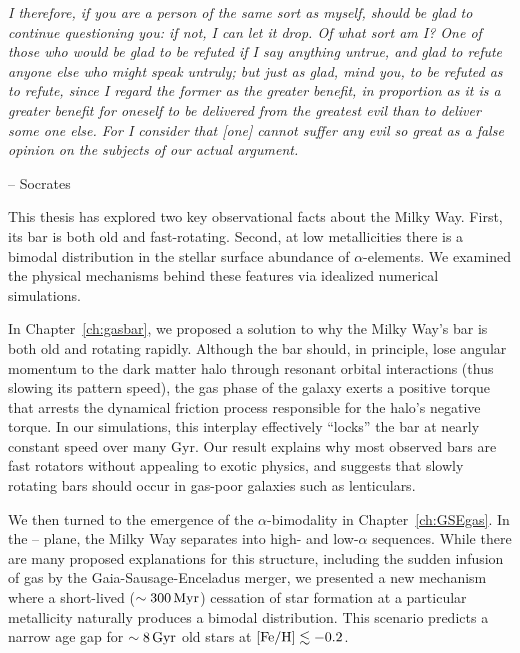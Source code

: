 
\begin{adjustwidth}{.8cm}{0cm}
\textit{I therefore, if you are a person of the same sort as myself, should be glad to continue questioning you: if not, I can let it drop. Of what sort am I? One of those who would be glad to be refuted if I say anything untrue, and glad to refute anyone else who might speak untruly; but just as glad, mind you, to be refuted as to refute, since I regard the former as the greater benefit, in proportion as it is a greater benefit for oneself to be delivered from the greatest evil than to deliver some one else. For I consider that [one] cannot suffer any evil so great as a false opinion on the subjects of our actual argument.}

\hspace{9cm} -- Socrates
\end{adjustwidth}

\hfill \break
\noindent
This thesis has explored two key observational facts about the Milky Way. First, its bar is both old and fast-rotating. Second, at low metallicities there is a bimodal distribution in the stellar surface abundance of $\alpha$-elements. We examined the physical mechanisms behind these features via idealized numerical simulations.

In Chapter~\ref{ch:gasbar}, we proposed a solution to why the Milky Way's bar is both old and rotating rapidly. Although the bar should, in principle, lose angular momentum to the dark matter halo through resonant orbital interactions (thus slowing its pattern speed), the gas phase of the galaxy exerts a positive torque that arrests the dynamical friction process responsible for the halo's negative torque. In our simulations, this interplay effectively ``locks'' the bar at nearly constant speed over many Gyr. Our result explains why most observed bars are fast rotators without appealing to exotic physics, and suggests that slowly rotating bars should occur in gas-poor galaxies such as lenticulars.

We then turned to the emergence of the $\alpha$-bimodality in Chapter~\ref{ch:GSEgas}. In the \alphaFe--\FeH{} plane, the Milky Way separates into high- and low-$\alpha$ sequences. While there are many proposed explanations for this structure, including the sudden infusion of gas by the Gaia-Sausage-Enceladus merger, we presented a new mechanism where a short-lived ($\sim300\,\textrm{Myr}$) cessation of star formation at a particular metallicity naturally produces a bimodal \alphaFe{} distribution. This scenario predicts a narrow age gap for $\sim8\,\textrm{Gyr}$ old stars at $[\textrm{Fe}/\textrm{H}] \lesssim -0.2$.

